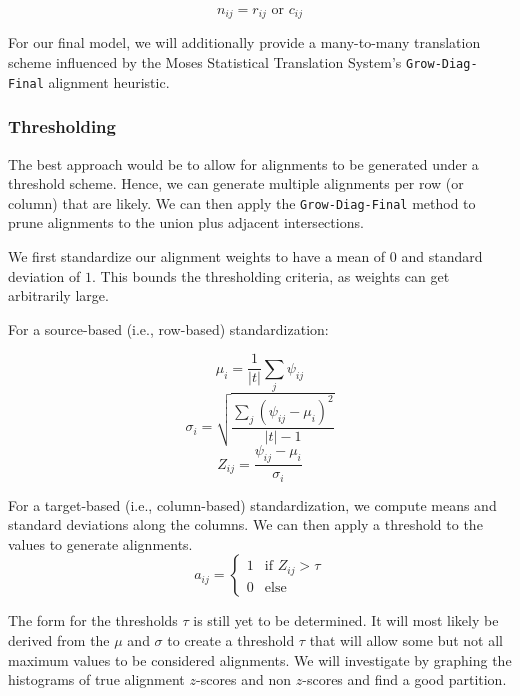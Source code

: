 \documentclass[twoside,twocolumn]{article}
\begin{document}
\begin{equation}
  n_{ij} = r_{ij} \text{ or } c_{ij}
\end{equation}

For our final model, we will additionally provide a many-to-many translation
scheme influenced by the Moses Statistical Translation System's
\verb|Grow-Diag-Final| alignment heuristic.

\subsubsection{Thresholding}

The best approach would be to allow for alignments to be generated under a
threshold scheme. Hence, we can generate multiple alignments per row (or column)
that are likely. We can then apply the \verb|Grow-Diag-Final| method to prune
alignments to the union plus adjacent intersections.

We first standardize our alignment weights to have a mean of $0$ and standard
deviation of $1$. This bounds the thresholding criteria, as weights can get
arbitrarily large.

For a source-based (i.e., row-based) standardization:

\begin{equation}
  \mu_{i} = \frac{1}{|t|} \sum_j \psi_{ij}
\end{equation}
\begin{equation}
  \sigma_{i} = \sqrt{\frac{\sum_j \left( \psi_{ij} - \mu_i \right)^2}{|t|-1}}
\end{equation}
\begin{equation}
  Z_{ij} = \frac{\psi_{ij} - \mu_i}{\sigma_i}
\end{equation}

For a target-based (i.e., column-based) standardization, we compute means and
standard deviations along the columns. We can then apply a threshold to the
values to generate alignments.
\begin{equation}
  a_{ij} = \begin{cases}
    1 & \text{if } Z_{ij} > \tau \\
    0 & \text{else}
  \end{cases}
\end{equation}

The form for the thresholds $\tau$ is still yet to be determined. It will most
likely be derived from the $\mu$ and $\sigma$ to create a threshold $\tau$ that
will allow some but not all maximum values to be considered alignments. We will
investigate by graphing the histograms of true alignment $z$-scores and non
$z$-scores and find a good partition.
\end{document}
